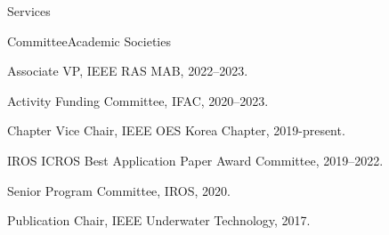 \begin{rSection}{Services}

\begin{rSubsection}{Committee}{}{Academic Societies}{}
  \item Associate VP, IEEE RAS MAB, 2022--2023.
  \item Activity Funding Committee, IFAC, 2020--2023.
  \item Chapter Vice Chair, IEEE OES Korea Chapter, 2019-present.
  \item IROS ICROS Best Application Paper Award Committee, 2019--2022.



  \item Senior Program Committee, IROS, 2020.


  \item Publication Chair, IEEE Underwater Technology, 2017.

\end{rSubsection}


%
%


\end{rSection}
